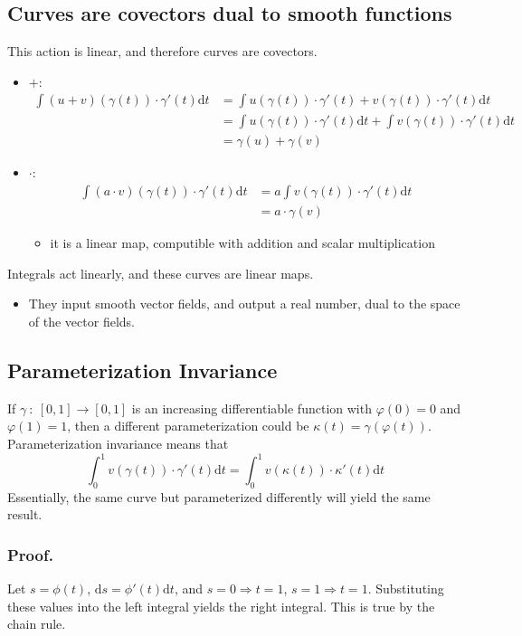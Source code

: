 \documentclass[10pt]{article}
\begin{document}
\subsection*{Curves are covectors dual to smooth functions}
This action is linear, and therefore curves are covectors.
\begin{itemize}
    \item $+$: 
    \begin{align*}
        \int(u + v) (\gamma(t)) \cdot \gamma'(t) \text{d}t &= \int u(\gamma(t)) \cdot \gamma'(t) + v(\gamma(t)) \cdot \gamma'(t) \text{d}t \\
        &= \int u(\gamma(t)) \cdot \gamma'(t) \text{d}t + \int v(\gamma(t)) \cdot \gamma'(t) \text{d}t \\
        &= \gamma(u) + \gamma(v)
    \end{align*}
    \item $\cdot$:
    \begin{align*}
        \int(a \cdot v)(\gamma(t)) \cdot \gamma'(t) \text{d}t &= a \int v(\gamma(t)) \cdot \gamma'(t) \text{d}t \\
        &= a \cdot \gamma(v)
    \end{align*}
    \begin{itemize}
        \item it is a linear map, computible with addition and scalar multiplication
    \end{itemize}
\end{itemize}
Integrals act linearly, and these curves are linear maps.
\begin{itemize}
    \item They input smooth vector fields, and output a real number, dual to the space of the vector fields.
\end{itemize}

\subsection*{Parameterization Invariance}
If $\gamma \::\: [0, 1] \rightarrow [0, 1]$ is an increasing differentiable function with $\varphi(0) = 0$ and $\varphi(1) = 1$, then a different parameterization could be $\kappa(t) = \gamma(\varphi(t))$.  Parameterization invariance means that
\[\int_0^1 v(\gamma(t)) \cdot \gamma'(t) \text{d}t = \int_0^1 v(\kappa(t)) \cdot \kappa'(t) \text{d}t\]
Essentially, the same curve but parameterized differently will yield the same result.
\subsubsection*{Proof.}
Let $s = \phi(t)$, $\text{d}s = \phi'(t) \text{d}t$, and $s = 0 \Rightarrow t = 1$, $s = 1 \Rightarrow t = 1$.  Substituting these values into the left integral yields the right integral.  This is true by the chain rule.
\end{document}
